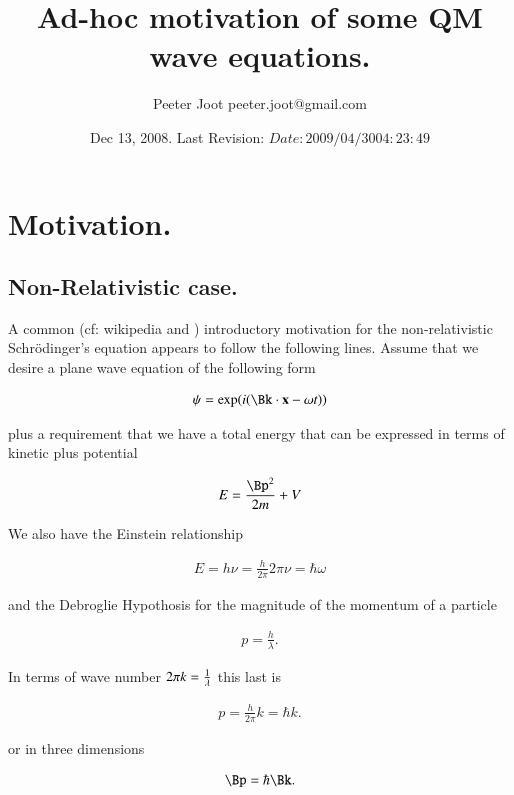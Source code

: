 \documentclass{article}
\title{ Ad-hoc motivation of some QM wave equations. }
\author{Peeter Joot \quad peeter.joot@gmail.com}
\date{ Dec 13, 2008.  Last Revision: $Date: 2009/04/30 04:23:49 $ }
\begin{document}
\maketitle{}

\tableofcontents

\section{ Motivation. }

\subsection{ Non-Relativistic case. }

A common (cf: wikipedia and \cite{french1998iqp}) introductory motivation for the non-relativistic Schr\"{o}dinger's equation appears to follow the following lines.  Assume that
we desire a plane wave equation of the following form

\begin{align*}
\psi = \exp(i (\Bk \cdot \Bx - \omega t))
\end{align*}

plus a requirement that we have a total energy that can be expressed in terms of kinetic plus potential

\begin{align}\label{eqn:energy}
E = \frac{\Bp^2}{2m} + V
\end{align}

We also have the Einstein relationship

\begin{align}
E = h \nu = \frac{h}{2\pi} 2 \pi \nu = \hbar \omega
\end{align}

and the Debroglie Hypothosis for the magnitude of the momentum of a particle

\begin{align*}
p = \frac{h}{\lambda}.
\end{align*}

In terms of wave number $2 \pi k = \frac{1}{\lambda}$ this last is

\begin{align*}
p = \frac{h}{2\pi} k = \hbar k.
\end{align*}

or in three dimensions

\begin{align*}
\Bp = \hbar \Bk.
\end{align*}
\end{document}
